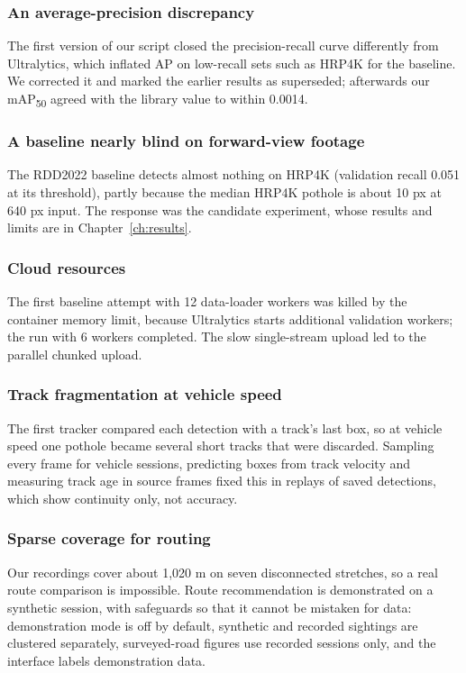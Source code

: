 \subsubsection*{An average-precision discrepancy}
The first version of our script closed the precision-recall curve differently from Ultralytics, which inflated AP on low-recall sets such as HRP4K for the baseline. We corrected it and marked the earlier results as superseded; afterwards our mAP\textsubscript{50} agreed with the library value to within 0.0014.

\subsubsection*{A baseline nearly blind on forward-view footage}
The RDD2022 baseline detects almost nothing on HRP4K (validation recall 0.051 at its threshold), partly because the median HRP4K pothole is about 10 px at 640 px input. The response was the candidate experiment, whose results and limits are in Chapter~\ref{ch:results}.

\subsubsection*{Cloud resources}
The first baseline attempt with 12 data-loader workers was killed by the container memory limit, because Ultralytics starts additional validation workers; the run with 6 workers completed. The slow single-stream upload led to the parallel chunked upload.

\subsubsection*{Track fragmentation at vehicle speed}
The first tracker compared each detection with a track's last box, so at vehicle speed one pothole became several short tracks that were discarded. Sampling every frame for vehicle sessions, predicting boxes from track velocity and measuring track age in source frames fixed this in replays of saved detections, which show continuity only, not accuracy.

\subsubsection*{Sparse coverage for routing}
Our recordings cover about 1,020 m on seven disconnected stretches, so a real route comparison is impossible. Route recommendation is demonstrated on a synthetic session, with safeguards so that it cannot be mistaken for data: demonstration mode is off by default, synthetic and recorded sightings are clustered separately, surveyed-road figures use recorded sessions only, and the interface labels demonstration data.
